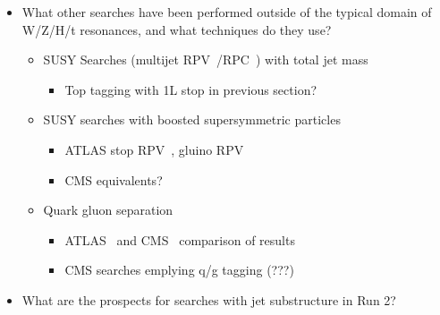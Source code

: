 \label{othersearches}

\begin{itemize}
\item What other searches have been performed outside of the typical domain of W/Z/H/t resonances, and what techniques do they use?
\begin{itemize}
 	\item SUSY Searches (multijet RPV~\cite{ATLAS-ManyJets-RPV}/RPC~\cite{ATLAS-ManyJets-RPC}) with total jet mass
 	\begin{itemize}
 		\item Top tagging with 1L stop in previous section?
 	\end{itemize}
 	\item SUSY searches with boosted supersymmetric particles
 	\begin{itemize}
 		\item ATLAS stop RPV~\cite{ATLAS-Stop-RPV}, gluino RPV~\cite{ATLAS-ManyJets-RPV-2011}
 		\item CMS equivalents?
 	\end{itemize}
 	\item Quark gluon separation
 	\begin{itemize}
 		\item ATLAS~\cite{ATLAS-QG} and CMS~\cite{CMS-QG} comparison of results
 		\item CMS searches emplying q/g tagging (???)
 	\end{itemize}
 \end{itemize} 
\item What are the prospects for searches with jet substructure in Run 2?
\end{itemize}
